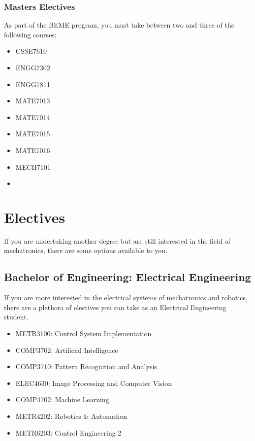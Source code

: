 \documentclass[a4paper,12pt]{report}
\begin{document}
\subsection{Masters Electives}
As part of the BEME program, you must take between two and three of the following courses:
\begin{multicols}{3}
    \begin{itemize}
        \item CSSE7610
        \item ENGG7302
        \item ENGG7811
        \item MATE7013
        \item MATE7014
        \item MATE7015
        \item MATE7016
        \item MECH7101
        \item[]
    \end{itemize}
\end{multicols}


\chapter{Electives}
If you are undertaking another degree but are still interested in the field of mechatronics, there are some options available to you.

\section{Bachelor of Engineering: Electrical Engineering}
\vspace*{3mm}
If you are more interested in the electrical systems of mechatronics and robotics, there are a plethora of electives you can take as an Electrical Engineering student.
\begin{multicols}{2}
    \begin{itemize}
        \item METR3100: Control System Implementation
        \item COMP3702: Artificial Intelligence
        \item COMP3710: Pattern Recognition and Analysis
        \item ELEC4630: Image Processing and Computer Vision
        \item COMP4702: Machine Learning
        \item METR4202: Robotics \& Automation
        \item METR6203: Control Engineering 2
    \end{itemize}
\end{multicols}
\end{document}
